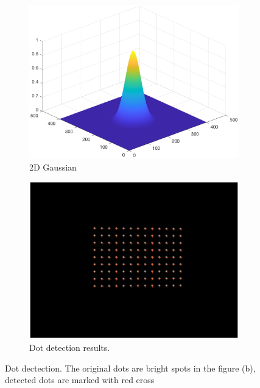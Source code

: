 \begin{figure}[h!]
	\centering
	\begin{subfigure}[t]{0.45\linewidth}
		\centering
		\includegraphics[width=1\linewidth]{figures/part2/gaussian_dis.eps}
		\caption{2D Gaussian}
		\label{fig:gaussian_dis}
	\end{subfigure}
	\begin{subfigure}[t]{0.45\linewidth}
		\centering
		\includegraphics[width=1\linewidth]{figures/part2/dot_detect.eps}
		\caption{Dot detection results.}
		\label{fig:dot_detect}
	\end{subfigure}
	\caption{Dot dectection. The original dots are  bright spots in the figure (b), detected dots are marked with red cross}
\end{figure}

